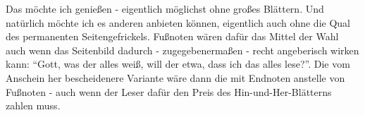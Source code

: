 Das möchte ich genießen - eigentlich möglichst ohne großes Blättern. Und
natürlich möchte ich es anderen anbieten können, eigentlich auch ohne die Qual
des permanenten Seitengefrickels. Fußnoten wären dafür das Mittel der Wahl auch
wenn das Seitenbild dadurch - zugegebenermaßen - recht angeberisch wirken kann:
``Gott, was der alles weiß, will der etwa, dass ich das alles
lese?''. Die vom Anschein her bescheidenere Variante wäre
dann die mit Endnoten anstelle von Fußnoten - auch wenn der Leser dafür den
Preis des Hin-und-Her-Blätterns zahlen muss.

